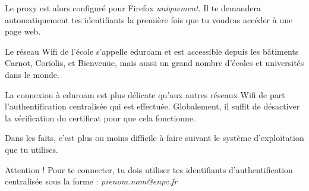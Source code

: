 \documentclass{ki019}
\begin{document}
        Le proxy est alors configuré pour Firefox \emph{uniquement}. Il te demandera automatiquement tes identifiants la première fois que tu voudras accéder à une page web.





    Le réseau Wifi de l’école s’appelle eduroam et est accessible depuis les bâtiments Carnot, Coriolis, et Bienvenüe, mais aussi un grand nombre d'écoles et universités dans le monde.

    La connexion à eduroam est plus délicate qu’aux autres réseaux Wifi de part l'authentification centralisée qui est effectuée. Globalement, il suffit de désactiver la vérification du certificat pour que cela fonctionne.

    Dans les faits, c’est plus ou moins difficile à faire suivant le système d’exploitation que tu utilises.

    Attention ! Pour te connecter, tu dois utiliser tes identifiants d’authentification centralisée sous la forme : \emph{prenom.nom@enpc.fr}

\newpage
\end{document}
